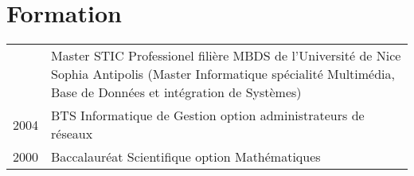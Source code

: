 \section{\texorpdfstring{\color{Blue}Formation}{Formation}}
\begin{tabular}{rp{14cm}}
 \parbox{\datebox}{} & Master STIC Professionel filière MBDS
 de l'Université de Nice Sophia Antipolis (Master Informatique spécialité Multimédia, Base de Données et
 intégration de Systèmes) \\ 
 2004 & BTS Informatique de Gestion option administrateurs de réseaux \\
 2000 & Baccalauréat Scientifique option Mathématiques
\end{tabular}